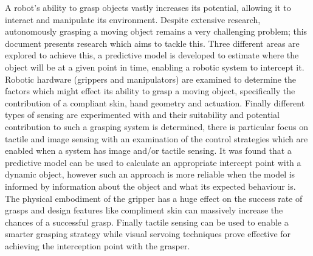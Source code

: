 % 
% 
%

A robot's ability to grasp objects vastly increases its potential, allowing it to interact and manipulate its environment. 
Despite extensive research, autonomously grasping a moving object remains a very challenging problem; this document presents research which aims to tackle this. 
Three different areas are explored to achieve this, a predictive model is developed to estimate where the object will be at a given point in time, enabling a robotic system to intercept it. Robotic hardware (grippers and manipulators) are examined to determine the factors which might effect its ability to grasp a moving object, specifically the contribution of a compliant skin, hand geometry and actuation. Finally different types of sensing are experimented with and their suitability and potential contribution to such a grasping system is determined, there is particular focus on tactile and image sensing with an examination of the control strategies which are enabled when a system has image and/or tactile sensing. 
It was found that a predictive model can be used to calculate an appropriate intercept point with a dynamic object, however such an approach is more reliable when the model is informed by information about the object and what its expected behaviour is. The physical embodiment of the gripper has a huge effect on the success rate of grasps and design features like compliment skin can massively increase the chances of a successful grasp. Finally tactile sensing can be used to enable a smarter grasping strategy while visual servoing techniques prove effective for achieving the interception point with the grasper.




